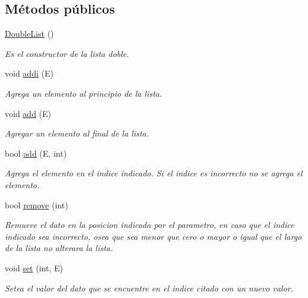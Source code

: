 \subsection*{Métodos públicos}
\begin{DoxyCompactItemize}
\item 
\hypertarget{classDoubleList_ab54db9c718c7188f9413ef2b9982dd43}{\hyperlink{classDoubleList_ab54db9c718c7188f9413ef2b9982dd43}{Double\-List} ()}\label{classDoubleList_ab54db9c718c7188f9413ef2b9982dd43}

\begin{DoxyCompactList}\small\item\em Es el constructor de la lista doble. \end{DoxyCompactList}\item 
void \hyperlink{classDoubleList_a621684e61b8d9d41cd107174d9877b1e}{addi} (E)
\begin{DoxyCompactList}\small\item\em Agrega un elemento al principio de la lista. \end{DoxyCompactList}\item 
void \hyperlink{classDoubleList_adb96e6908d3d564722225b848350aa82}{add} (E)
\begin{DoxyCompactList}\small\item\em Agregar un elemento al final de la lista. \end{DoxyCompactList}\item 
bool \hyperlink{classDoubleList_a84e3bb8be7d67b43dd3b63d5a47f80ed}{add} (E, int)
\begin{DoxyCompactList}\small\item\em Agrega el elemento en el indice indicado. Si el indice es incorrecto no se agrega el elemento. \end{DoxyCompactList}\item 
bool \hyperlink{classDoubleList_a844c2c4c3b8260bd58ab94307359fb62}{remove} (int)
\begin{DoxyCompactList}\small\item\em Remueve el dato en la posicion indicada por el parametro, en caso que el indice indicado sea incorrecto, osea que sea menor que cero o mayor o igual que el largo de la lista no alterara la lista. \end{DoxyCompactList}\item 
void \hyperlink{classDoubleList_a3c95ac3c3190b347c4a343776264bf67}{set} (int, E)
\begin{DoxyCompactList}\small\item\em Setea el valor del dato que se encuentre en el indice citado con un nuevo valor. \end{DoxyCompactList}\item 

\end{DoxyCompactItemize}
